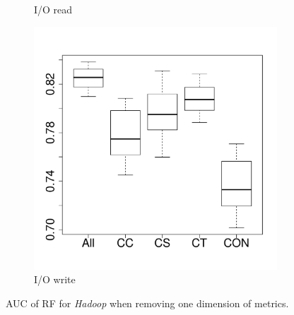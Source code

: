 \documentclass[10pt,journal,compsoc]{IEEEtran}
\begin{document}
\begin{figure}[t]
\begin{subfigure}{0.19\textwidth}
                \caption{I/O read}
        \end{subfigure}
        \begin{subfigure}{0.19\textwidth}
                \includegraphics[width=\linewidth]{Figures/iowrite-hadoopremove-importance.pdf}
                \caption{I/O write}
        \end{subfigure}
        
	\caption{AUC of RF for \emph{Hadoop} when removing one dimension of metrics.}
	\label{fig:importance-dimenssion-remove-hadoop}
\end{figure}
\end{document}
